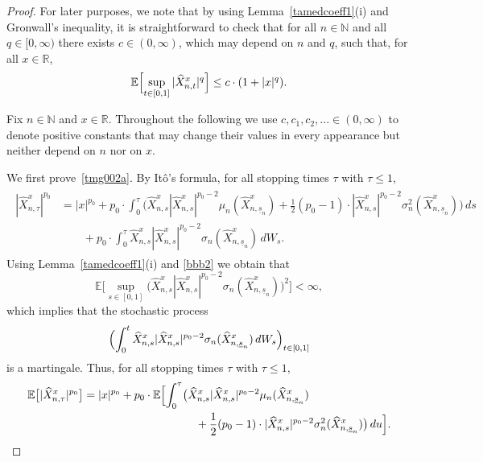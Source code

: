 \documentclass[11pt]{amsart}
\newcommand{\R}{{\mathbb R}}
\newcommand{\N}{{\mathbb N}}
\newcommand{\EE}{{\mathbb E}}
\newcommand{\eul}{{\widehat X}}
\newcommand{\usn}{\underline {s}_n}
\theoremstyle{plain}
\theoremstyle{definition}
\begin{document}
\begin{proof}
For later purposes, we  note that by using Lemma~\ref{tamedcoeff1}(i)
 and Gronwall's inequality, it is straightforward to check that for all $n\in\N$ and all $q\in [0,\infty)$ there exists $c\in (0,\infty)$, which may depend on $n$ and $q$, such that, for all $x\in\R$,
\begin{equation}\label{bbb2}
\EE\Bigl[\sup_{t\in [0,1]}|\eul^{x}_{n, t}|^q\Bigr] \leq  c\cdot (1+|x|^q).
\end{equation}

Fix $n\in\N$ and $x\in\R$. Throughout the following we  use $c,c_1,c_2,...\in(0,\infty)$ to  denote positive constants that may change their values in every appearance but neither depend on $n$ nor on $x$.

We first prove~\eqref{tmg002a}. By  It\^{o}'s formula, for all stopping times $\tau$ with $\tau \le 1$,
\begin{align*}%
\begin{aligned}
|\widehat X^x_{n,\tau}|^{p_0} & = |x|^{p_0}+p_0\cdot \int_0^\tau  \bigl( \widehat X^x_{n,s}|\widehat X^x_{n,s}|^{p_0-2}\mu_n(\widehat X^x_{n,\usn}) + \frac{1}{2}  (p_0-1) \cdot|\widehat X^x_{n,s}|^{p_0-2}\sigma_n^2(\widehat X^x_{n,\usn})\bigr)\, ds \\
& \qquad +  p_0\cdot \int_0^{\tau}  \widehat X^x_{n,s}|\widehat X^x_{n,s}|^{p_0-2}\sigma_n(\widehat X^x_{n,\usn})\, dW_s.
\end{aligned}
\end{align*}
Using Lemma~\ref{tamedcoeff1}(i) and  \eqref{bbb2} we obtain that
\[
\EE\bigl[\sup_{s\in[0,1]}\bigl(\widehat X^x_{n,s}|\widehat X^x_{n,s}|^{p_0-2}\sigma_n(\widehat X^x_{n,\usn})\bigr)
^2\bigr] < \infty,
\]
which implies that the stochastic process
\[
\Bigl(\int_0^{t} \widehat X^x_{n,s}|\widehat X^x_{n,s}|^{p_0-2}\sigma_n(\widehat X^x_{n,\usn})\, dW_s\Bigr)_{t\in[0,1]}
\]
is a martingale. Thus, for all stopping times $\tau$ with $\tau \le 1$,
\begin{equation}\label{tm2}
\begin{aligned}
\EE\bigl[|\widehat X^x_{n,\tau}|^{p_0}\bigr]
&  = |x|^{p_0}+p_0\cdot \EE\Bigl[\int_0^\tau \bigl( \widehat X^x_{n,s}|\widehat X^x_{n,s}|^{p_0-2}\mu_n(\widehat X^x_{n,\usn})\\
&\qquad\qquad\qquad\qquad\qquad + \frac{1}{2}  (p_0-1) \cdot|\widehat X^x_{n,s}|^{p_0-2}\sigma_n^2(\widehat X^x_{n,\usn})\bigr)\, du\Bigr].
\end{aligned}
\end{equation}


\end{proof}
\end{document}
